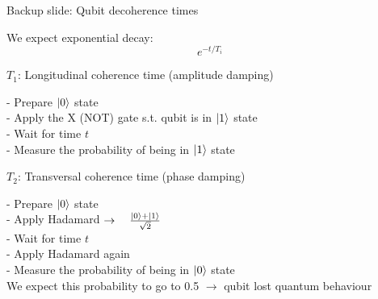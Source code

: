\documentclass[10pt]{beamer}
\begin{document}
{
\begin{frame}[fragile]{Backup slide: Qubit decoherence times}

We expect exponential decay:
\begin{equation}
e^{−t/T_i}
\end{equation}

\begin{block}{$T_1$: Longitudinal coherence time (amplitude damping)}

- Prepare $\ket{0}$ state\\
- Apply the X (NOT) gate s.t. qubit is in $\ket{1}$ state\\
- Wait for time $t$\\
- Measure the probability of being in $\ket{1}$ state

\end{block}
\begin{block}{$T_2$: Transversal coherence time (phase damping)}

- Prepare $\ket{0}$ state\\
- Apply Hadamard $\rightarrow \quad \frac{\ket{0}+\ket{1}}{\sqrt{2}}$\\
- Wait for time $t$\\
- Apply Hadamard again\\
- Measure the probability of being in $\ket{0}$ state\\

We expect this probability to go to 0.5 $\rightarrow$ qubit lost quantum behaviour
\end{block}

\end{frame}
}
\end{document}
